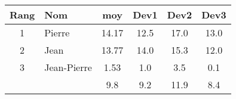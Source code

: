 \documentclass{article}
\begin{document}
\begin{tabular}{|c|l|c|*{3}{c|}}
\hline
 Rang&Nom&moy&Dev1&Dev2&Dev3\\
\hline
1&Pierre&14.17&12.5&17.0&13.0\\
2&Jean&13.77&14.0&15.3&12.0\\
3&Jean-Pierre&1.53&1.0&3.5&0.1\\
\hline
&&9.8&9.2&11.9&8.4\\
\hline
\end{tabular}
\end{document}
